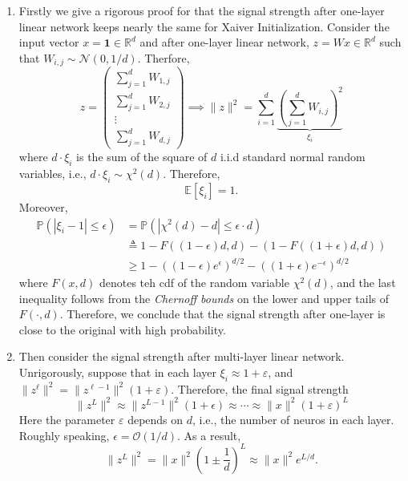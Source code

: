 \begin{enumerate}
\item
Firstly we give a rigorous proof for that the signal strength after one-layer linear network keeps nearly the same for Xaiver Initialization.
Consider the input vector $x=\bm 1\in\mathbb{R}^d$ and after one-layer linear network, $z=Wx\in\mathbb{R}^d$ such that $W_{i,j}\sim\mathcal{N}(0,1/d)$.
Therfore,
\[
z=\begin{pmatrix}
\sum_{j=1}^d W_{1,j}\\
\sum_{j=1}^d W_{2,j}\\
\vdots\\
\sum_{j=1}^d W_{d,j}
\end{pmatrix}
\implies
\|z\|^2 =\sum_{i=1}^d\underbrace{\left(\sum_{j=1}^d W_{i,j}\right)^2}_{\xi_i}
\]
where $d\cdot \xi_i$ is the sum of the square of $d$ i.i.d standard normal random variables, i.e.,
$d\cdot \xi_i\sim \chi^2(d)$. Therefore,
\[
\mathbb{E}[\xi_i] = 1.
\]
Moreover, 
\begin{align*}
\mathbb{P}(|\xi_i - 1|\le\epsilon) &= \mathbb{P}(|\chi^2(d)-d|\le \epsilon\cdot d)\\
&\triangleq 
1 - F((1-\epsilon)d,d) - (1-F((1+\epsilon)d,d))\\
&\ge 1 - ((1-\epsilon)e^{\epsilon})^{d/2}- ((1+\epsilon)e^{-\epsilon})^{d/2}
\end{align*}
where $F(x,d)$ denotes teh cdf of the random variable $\chi^2(d)$, and the last inequality follows from the \emph{Chernoff bounds} on the lower and upper tails of $F(\cdot,d)$.
Therefore, we conclude that the signal strength after one-layer is close to the original with high probability.
\item
Then consider the signal strength after multi-layer linear network. Unrigorously, suppose that in each layer $\xi_i\approx1+\varepsilon$, and $\|z^{\ell}\|^2 = \|z^{\ell-1}\|^2(1+\varepsilon)$.
Therefore, the final signal strength
\[
\|z^L\|^2 \approx\|z^{L-1}\|^2(1+\epsilon)\approx\cdots\approx\|x\|^2(1+\varepsilon)^L
\]
Here the parameter $\varepsilon$ depends on $d$, i.e., the number of neuros in each layer. Roughly speaking, $\epsilon = \mathcal{O}(1/d)$.
As a result,
\[
\|z^L\|^2 = \|x\|^2 (1\pm\frac{1}{d})^L\approx \|x\|^2e^{L/d}.
\]
\end{enumerate}

